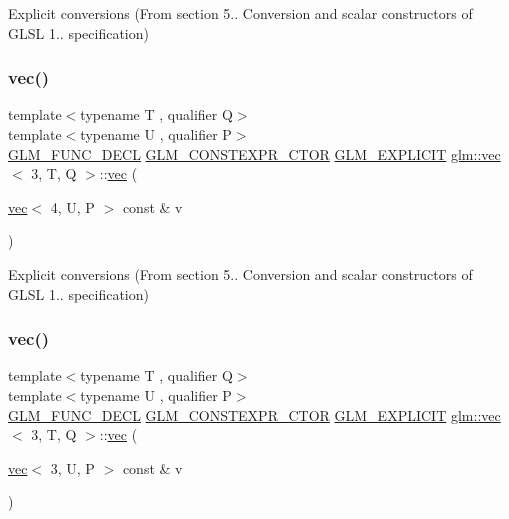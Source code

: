 Explicit conversions (From section 5.. Conversion and scalar constructors of G\+L\+SL 1.. specification) 

\mbox{\label{structglm_1_1vec_3_013_00_01_t_00_01_q_01_4_a6a3c6e504114be5310317d725eda50ea}} 
\subsubsection{\texorpdfstring{vec()}{vec()}\hspace{0.1cm}{\footnotesize\ttfamily [12/23]}}
{\footnotesize\ttfamily template$<$typename T , qualifier Q$>$ \\
template$<$typename U , qualifier P$>$ \\
\hyperlink{setup_8hpp_ab2d052de21a70539923e9bcbf6e83a51}{G\+L\+M\+\_\+\+F\+U\+N\+C\+\_\+\+D\+E\+CL} \hyperlink{setup_8hpp_ad34178a09666081abdb573c14d1f4a5a}{G\+L\+M\+\_\+\+C\+O\+N\+S\+T\+E\+X\+P\+R\+\_\+\+C\+T\+OR} \hyperlink{setup_8hpp_a6c74f5a5e7b134ab69023ff9a30d4d5d}{G\+L\+M\+\_\+\+E\+X\+P\+L\+I\+C\+IT} \hyperlink{structglm_1_1vec}{glm\+::vec}$<$ 3, T, Q $>$\+::\hyperlink{structglm_1_1vec}{vec} (\begin{DoxyParamCaption}\item[{\hyperlink{structglm_1_1vec}{vec}$<$ 4, U, P $>$ const \&}]{v }\end{DoxyParamCaption})}



Explicit conversions (From section 5.. Conversion and scalar constructors of G\+L\+SL 1.. specification) 

\mbox{\label{structglm_1_1vec_3_013_00_01_t_00_01_q_01_4_a47d23576cd135fb6f6b964ed9d4e3599}} 
\subsubsection{\texorpdfstring{vec()}{vec()}\hspace{0.1cm}{\footnotesize\ttfamily [13/23]}}
{\footnotesize\ttfamily template$<$typename T , qualifier Q$>$ \\
template$<$typename U , qualifier P$>$ \\
\hyperlink{setup_8hpp_ab2d052de21a70539923e9bcbf6e83a51}{G\+L\+M\+\_\+\+F\+U\+N\+C\+\_\+\+D\+E\+CL} \hyperlink{setup_8hpp_ad34178a09666081abdb573c14d1f4a5a}{G\+L\+M\+\_\+\+C\+O\+N\+S\+T\+E\+X\+P\+R\+\_\+\+C\+T\+OR} \hyperlink{setup_8hpp_a6c74f5a5e7b134ab69023ff9a30d4d5d}{G\+L\+M\+\_\+\+E\+X\+P\+L\+I\+C\+IT} \hyperlink{structglm_1_1vec}{glm\+::vec}$<$ 3, T, Q $>$\+::\hyperlink{structglm_1_1vec}{vec} (\begin{DoxyParamCaption}\item[{\hyperlink{structglm_1_1vec}{vec}$<$ 3, U, P $>$ const \&}]{v }\end{DoxyParamCaption})}



